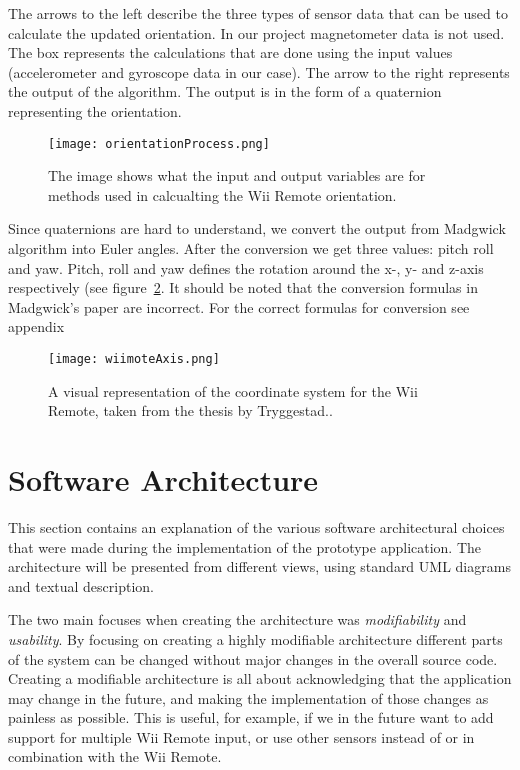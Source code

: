 The arrows to the left describe the three types of sensor data that can be used to calculate the updated orientation. In our project magnetometer data is not used. The box represents the calculations that are done using the input values (accelerometer and gyroscope data in our case). The arrow to the right represents the output of the algorithm. The output is in the form of a quaternion representing the orientation.

\begin{figure}[h!]
  \centering
    \texttt{[image: orientationProcess.png]}
    \caption{\footnotesize The image shows what the input and output variables are for methods used in calcualting the Wii Remote orientation.}
    \label{fig:orientationProcess}
\end{figure}

Since quaternions are hard to understand, we convert the output from Madgwick algorithm into Euler angles. After the conversion we get three values: pitch roll and yaw. Pitch, roll and yaw defines the rotation around the x-, y- and z-axis respectively (see figure~\ref{fig:wiiAxis}. It should be noted that the conversion formulas in Madgwick’s paper \cite{madgwick} are incorrect. For the correct formulas for conversion see appendix~\cite{app:eulerConversion}

\begin{figure}[h!]
  \centering
    \texttt{[image: wiimoteAxis.png]}
    \caption{\footnotesize A visual representation of the coordinate system for the Wii Remote, taken from the thesis by Tryggestad.\cite{Tryggestad}.}
    \label{fig:wiiAxis}
\end{figure}

\section{Software Architecture}
This section contains an explanation of the various software architectural choices that were made during the implementation of the prototype application. The architecture will be presented from different views, using standard UML diagrams and textual description.

The two main focuses when creating the architecture was \emph{modifiability} and \emph{usability}. By focusing on creating a highly modifiable architecture different parts of the system can be changed without major changes in the overall source code. Creating a modifiable architecture is all about acknowledging that the application may change in the future, and  making the implementation of those changes as painless as possible. This is useful, for example, if we in the future want to add support for multiple Wii Remote input, or use other sensors instead of or in combination with the Wii Remote.

